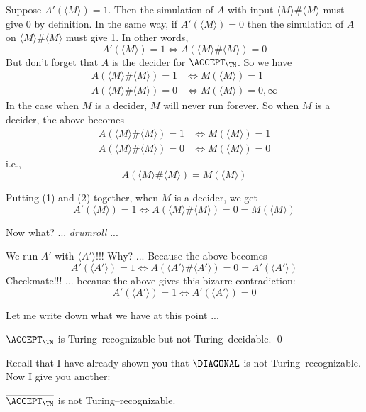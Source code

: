 Suppose $A'(\langle M \rangle) = 1$.
Then the simulation of $A$ with input 
$\langle M \rangle \# \langle M \rangle$ must give 0 by definition.
In the same way, if
$A'(\langle M \rangle) = 0$
then the simulation of $A$ on 
$\langle M \rangle \# \langle M \rangle$ must give 1.
In other words,
\[
A'(\langle M \rangle) = 1
\iff
A(\langle M \rangle \# \langle M \rangle) = 0
\tag{1}
\]
But don't forget that $A$ is the decider for $\ACCEPT_\TM$.
So we have
\begin{align*}
A(\langle M \rangle \# \langle M \rangle) = 1
&\iff M(\langle M \rangle) = 1 \\
A(\langle M \rangle \# \langle M \rangle) = 0
&\iff M(\langle M \rangle) = 0, \infty
\end{align*}
In the case when $M$ is a decider, $M$ will never run forever.
So when $M$ is a decider, the above becomes
\begin{align*}
A(\langle M \rangle \# \langle M \rangle) = 1
&\iff M(\langle M \rangle) = 1 \\
A(\langle M \rangle \# \langle M \rangle) = 0
&\iff M(\langle M \rangle) = 0
\end{align*}
i.e.,
\[
A(\langle M \rangle \# \langle M \rangle)
= M(\langle M \rangle)
\tag{2}
\]

Putting (1) and (2) together, when $M$ is a decider,
we get
\[
A'(\langle M \rangle) = 1
\iff
A(\langle M \rangle \# \langle M \rangle) = 0 = M(\langle M \rangle)
\]

Now what? ... \textit{drumroll} ... 

We run $A'$ with $\langle A' \rangle$!!!
Why? ... Because the above becomes
\[
A'(\langle A' \rangle) = 1
\iff
A(\langle A' \rangle \# \langle A' \rangle) = 0
= A'(\langle A' \rangle)
\]
Checkmate!!! ... because the above
gives this bizarre contradiction:
\[
A'(\langle A' \rangle) = 1
\iff
A'(\langle A' \rangle) = 0
\]


Let me write down what we have at this point ...

\begin{thm}
$\ACCEPT_\TM$ is Turing--recognizable but 
 not Turing--decidable.
\qed
\end{thm}

Recall that I have already shown you that
$\DIAGONAL$ is not Turing--recognizable.
Now I give you another:

\begin{thm}
$\overline{\ACCEPT_\TM}$ is not Turing--recognizable.
\end{thm}

